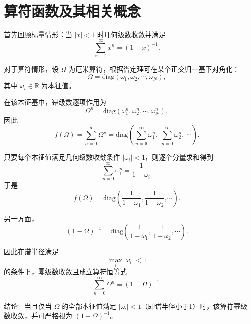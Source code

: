﻿%
\section{算符函数及其相关概念}

\begin{solution}[算符函数与幂级数]

\answer
首先回顾标量情形：当 $|x|<1$ 时几何级数收敛并满足
\[
\sum_{n=0}^{\infty}x^n=(1-x)^{-1}.
\]

对于算符情形，设 $\Omega$ 为厄米算符，根据谱定理可在某个正交归一基下对角化：
\[
\Omega=\mathrm{diag}(\omega_1,\omega_2,\cdots,\omega_N),
\]
其中 $\omega_i\in\mathbb{R}$ 为本征值。

在该本征基中，幂级数逐项作用为
\[
\Omega^n=\mathrm{diag}(\omega_1^n,\omega_2^n,\cdots,\omega_N^n),
\]
因此
\[
f(\Omega)=\sum_{n=0}^{\infty}\Omega^n
=\mathrm{diag}\left(\sum_{n=0}^{\infty}\omega_1^n,\ \sum_{n=0}^{\infty}\omega_2^n,\ \cdots\right).
\]

只要每个本征值满足几何级数收敛条件 $|\omega_i|<1$，则逐个分量求和得到
\[
\sum_{n=0}^{\infty}\omega_i^n=\frac{1}{1-\omega_i}.
\]
于是
\[
f(\Omega)=\mathrm{diag}\left(\frac{1}{1-\omega_1},\frac{1}{1-\omega_2},\cdots\right).
\]

另一方面，
\[
(1-\Omega)^{-1}
=\mathrm{diag}\left(\frac{1}{1-\omega_1},\frac{1}{1-\omega_2},\cdots\right).
\]

因此在谱半径满足
\[
\max_i |\omega_i|<1
\]
的条件下，幂级数收敛且成立算符恒等式
\[
\sum_{n=0}^{\infty}\Omega^n=(1-\Omega)^{-1}.
\]

结论：当且仅当 $\Omega$ 的全部本征值满足 $|\omega_i|<1$（即谱半径小于1）时，该算符幂级数收敛，并可严格视为 $(1-\Omega)^{-1}$。
\end{solution}


